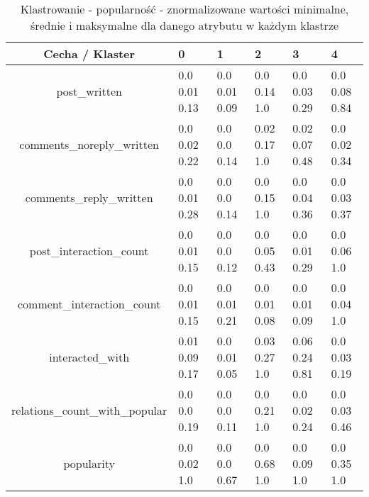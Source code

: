 \documentclass[polish,12pt]{aghthesis}
\begin{document}
\begin{table}[ht]
    \centering
  \begin{center}
\begin{tabular}{ |c|M{1cm}|M{1cm}|M{1cm}|M{1cm}|M{1cm}| } 
\hline
 Cecha / Klaster & 0 & 1 & 2 & 3 & 4 \\ [0.5ex] 
 \hline
post\_written & 0.0 0.01 0.13 & 0.0 0.01 0.09 & 0.0 0.14 1.0 & 0.0 0.03 0.29 & 0.0 0.08 0.84 \\ 
\hline
comments\_noreply\_written & 0.0 0.02 0.22 & 0.0 0.0 0.14 & 0.02 0.17 1.0 & 0.02 0.07 0.48 & 0.0 0.02 0.34 \\ 
\hline
comments\_reply\_written & 0.0 0.01 0.28 & 0.0 0.0 0.14 & 0.0 0.15 1.0 & 0.0 0.04 0.36 & 0.0 0.03 0.37 \\ 
\hline
post\_interaction\_count & 0.0 0.01 0.15 & 0.0 0.0 0.12 & 0.0 0.05 0.43 & 0.0 0.01 0.29 & 0.0 0.06 1.0 \\ 
\hline
comment\_interaction\_count & 0.0 0.01 0.15 & 0.0 0.01 0.21 & 0.0 0.01 0.08 & 0.0 0.01 0.09 & 0.0 0.04 1.0 \\ 
\hline
interacted\_with & 0.01 0.09 0.17 & 0.0 0.01 0.05 & 0.03 0.27 1.0 & 0.06 0.24 0.81 & 0.0 0.03 0.19 \\ 
\hline
relations\_count\_with\_popular & 0.0 0.0 0.19 & 0.0 0.0 0.11 & 0.0 0.21 1.0 & 0.0 0.02 0.24 & 0.0 0.03 0.46 \\ 
\hline
\hline
popularity & 0.0 0.02 1.0 & 0.0 0.0 0.67 & 0.0 0.68 1.0 & 0.0 0.09 1.0 & 0.0 0.35 1.0 \\ 
\hline
\end{tabular}
\end{center}
\caption{Klastrowanie - popularność - znormalizowane wartości minimalne, średnie i maksymalne dla danego atrybutu w każdym klastrze}
\label{tab:p_m}
\end{table}

\FloatBarrier
\end{document}
